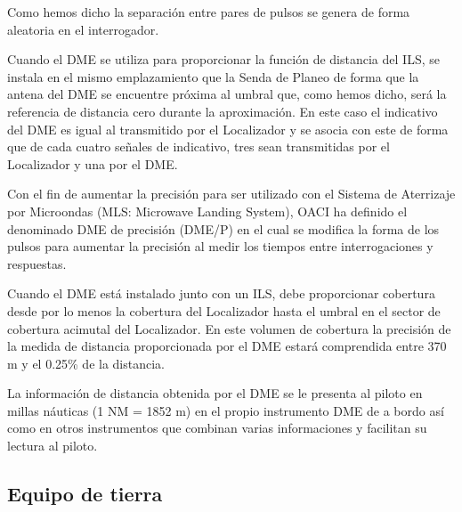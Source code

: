 Como hemos dicho la separaci\'on entre pares de pulsos se genera de forma aleatoria en el interrogador.

Cuando el DME se utiliza para proporcionar la funci\'on de distancia del ILS, se instala en el mismo emplazamiento que la Senda de Planeo de forma que la antena del DME se encuentre pr\'oxima al umbral que, como hemos dicho, ser\'a la referencia de distancia cero durante la aproximaci\'on. En este caso el indicativo del DME es igual al transmitido por el Localizador y se asocia con este de forma que de cada cuatro se\~nales de indicativo, tres sean transmitidas por el Localizador y una por el DME.

Con el fin de aumentar la precisi\'on para ser utilizado con el Sistema de Aterrizaje por Microondas (MLS: Microwave Landing System), OACI ha definido el denominado DME de precisi\'on (DME/P) en el cual se modifica la forma de los pulsos para aumentar la precisi\'on al medir los tiempos entre interrogaciones y respuestas.

Cuando el DME est\'a instalado junto con un ILS, debe proporcionar cobertura desde por lo menos la cobertura del Localizador hasta el umbral en el sector de cobertura acimutal del Localizador. En este volumen de cobertura la precisi\'on de la medida de distancia proporcionada por el DME estar\'a comprendida entre 370 m y el 0.25\% de la distancia.

La informaci\'on de distancia obtenida por el DME se le presenta al piloto en millas n\'auticas (1 NM = 1852 m) en el propio instrumento DME de a bordo as\'i como en otros instrumentos que combinan varias informaciones y facilitan su lectura al piloto.

\subsection{Equipo de tierra}
\label{sec:DME.equipo.tierra}

